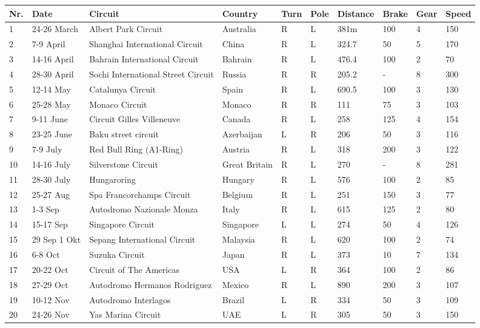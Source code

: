 \documentclass{article}
\begin{document}
\begin{tabularx}{.6\textwidth}{Xlllllllll}
Nr.	& Date	       & Circuit	                          & Country    & Turn & Pole  &Distance &Brake &Gear &Speed\\
\hline
1	  & 24-26 March	 & Albert Park Circuit	              & Australia  & R&L       & 381m &100 & 4 & 150\\
2	  & 7-9 April	   & Shanghai International Circuit     & China      & R&L       & 324.7 &50 & 5 & 170\\
3	  & 14-16 April	 & Bahrain International Circuit	    & Bahrain    & R&L       & 476.4 &100 & 2 & 70\\
4	  & 28-30 April	 & Sochi International Street Circuit & Russia     & R&R       & 205.2 &- & 8 & 300\\
5	  & 12-14 May	   & Catalunya Circuit	                & Spain      & R&L       & 690.5 &100 & 3 & 130\\
6	  & 25-28 May	   & Monaco Circuit	                    & Monaco     & R&R       & 111 &75 & 3 & 103\\
7	  & 9-11 June	   & Circuit Gilles Villeneuve	        & Canada     & R&L       & 258 &125 & 4 & 154 \\
8	  & 23-25 June	 & Baku street circuit	              & Azerbaijan & L&R       & 206 &50 & 3 & 116\\
9	  & 7-9 July	   & Red Bull Ring (A1-Ring)	          & Austria    & R&L       & 318 &200 & 3 & 122\\
10	& 14-16 July	 & Silverstone Circuit	              & Great Britain & R&L    & 270 &- & 8 & 281\\
11	& 28-30 July	 & Hungaroring	                      & Hungary    & R&L       & 576 &100 & 2 & 85\\
12	& 25-27 Aug	   & Spa Francorchamps Circuit	        & Belgium    & R&L       & 251 &150 & 3 & 77\\
13	& 1-3 Sep	     & Autodromo Nazionale Monza	        & Italy      & R&L       & 615 &125 & 2 & 80\\
14	& 15-17 Sep	   & Singapore Circuit	                & Singapore  & L&L       & 274 &50 & 4 & 126\\
15	& 29 Sep 1 Okt & Sepang International Circuit	      & Malaysia   & R&L       & 620 &100 & 2 & 74\\
16	& 6-8 Oct	     & Suzuka Circuit	                    & Japan      & R&L       & 373 &10 & 7 & 134\\
17	& 20-22 Oct	   & Circuit of The Americas	          & USA        & L&R       & 364 &100 & 2 & 86\\
18	& 27-29 Oct	   & Autodromo Hermanos Rodriguez	      & Mexico     & R&L       & 890 &200 & 3 & 107\\
19	& 10-12 Nov	   & Autodromo Interlagos	              & Brazil     & L&R       & 334 &50 & 3 & 109\\
20	& 24-26 Nov	   & Yas Marina Circuit	                & UAE        & L&R       & 305 &50 & 3 & 150\\
\end{tabularx}
\end{document}
